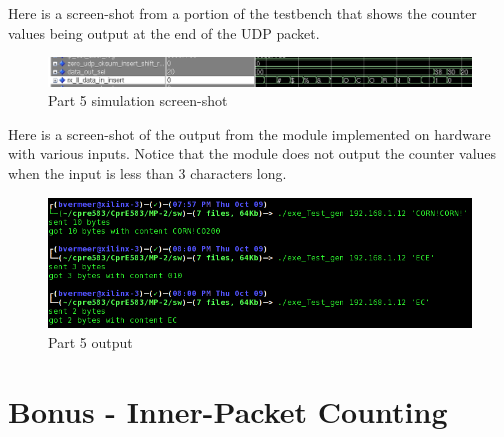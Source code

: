 \documentclass{article}
\begin{document}
Here is a screen-shot from a portion of the testbench that shows the counter values being output at the end of the UDP packet.

	\begin{figure}[H]
		\begin{center}
			\includegraphics[scale=0.45]{../part5_files/Part5_waveform_screenshot.png}
			\caption{Part 5 simulation screen-shot}
		\end{center}
	\end{figure}
	
Here is a screen-shot of the output from the module implemented on hardware with various inputs. Notice that the module does not output the counter values when the input is less than 3 characters long.

	\begin{figure}[H]
		\begin{center}
			\includegraphics[scale=0.45]{../part5_files/Part5_output_screenshot.png}
			\caption{Part 5 output}
		\end{center}
	\end{figure}


\section{Bonus - Inner-Packet Counting}








\end{document}
